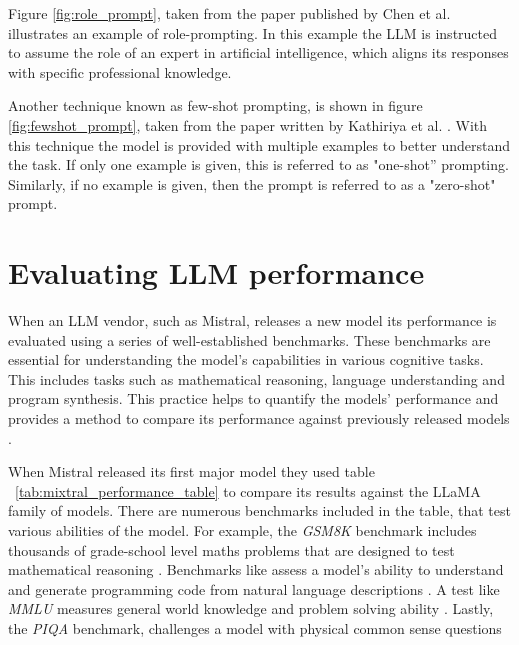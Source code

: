 Figure \ref{fig:role_prompt}, taken from the paper published by Chen et al. \cite{chen_unleashing_2023} illustrates an example of role-prompting. In this example the \gls{LLM} is instructed to assume the role of an expert in artificial intelligence, which aligns its responses with specific professional knowledge.





Another technique known as few-shot prompting, is shown in figure \ref{fig:fewshot_prompt}, taken from the paper written by Kathiriya et al. \cite{kathiriya_power_2023}. With this technique the model is provided with multiple examples to better understand the task. If only one example is given, this is referred to as "one-shot” prompting. Similarly, if no example is given, then the prompt is referred to as a "zero-shot" prompt.





\section{Evaluating LLM performance}


When an \gls{LLM} vendor, such as Mistral, releases a new model its performance is evaluated using a series of well-established benchmarks. These benchmarks are essential for understanding the model’s capabilities in various cognitive tasks. This includes tasks such as mathematical reasoning, language understanding and program synthesis. This practice helps to quantify the models' performance and provides a method to compare its performance against previously released models \cite{cobbe_training_2021, austin_program_2021, chen_evaluating_2021}.


When Mistral released its first major model they used table ~\ref{tab:mixtral_performance_table} to compare its results against the LLaMA family of models. There are numerous benchmarks included in the table, that test various abilities of the model. For example, the \textit{GSM8K} benchmark includes thousands of grade-school level maths problems that are designed to test mathematical reasoning \cite{cobbe_training_2021}. Benchmarks like  assess a model's ability to understand and generate programming code from natural language descriptions \cite{austin_program_2021}. A test like \textit{MMLU} measures general world knowledge and problem solving ability \cite{hendrycks_measuring_2021}. Lastly, the \textit{PIQA} benchmark, challenges a model with physical common sense questions \cite{bisk_piqa_2019-1}


